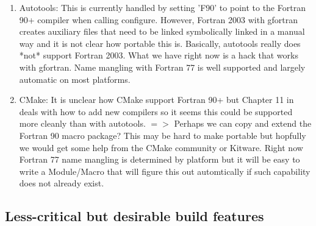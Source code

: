 \documentclass[pdf,ps2pdf,11pt]{SANDreport}
\begin{document}
\begin{enumerate}
\begin{enumerate}
  {}\item Autotools: This is currently handled by setting 'F90' to
  point to the Fortran 90+ compiler when calling configure.  However,
  Fortran 2003 with gfortran creates auxiliary files that need to be
  linked symbolically linked in a manual way and it is not clear how
  portable this is.  Basically, autotools really does *not* support
  Fortran 2003.  What we have right now is a hack that works with
  gfortran.  Name mangling with Fortran 77 is well supported and
  largely automatic on most platforms.

  {}\item CMake: It is unclear how CMake support Fortran 90+ but
  Chapter 11 in {}\cite{MasteringCMake_fourth} deals with how to add
  new compilers so it seems this could be supported more cleanly than
  with autotools. $=>$ Perhaps we can copy and extend the Fortran 90
  macro package?  This may be hard to make portable but hopfully we
  would get some help from the CMake community or Kitware.  Right now
  Fortran 77 name mangling is determined by platform but it will be
  easy to write a Module/Macro that will figure this out automtically
  if such capability does not already exist.

  \end{enumerate}

\end{enumerate}


%
{}\subsection{Less-critical but desirable build features}
%
\end{document}
